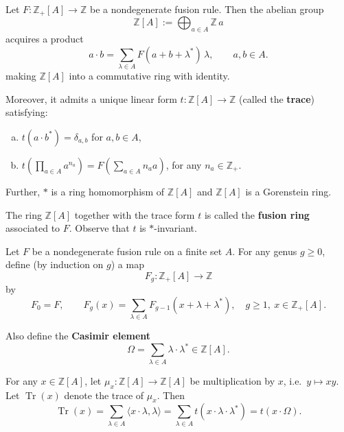 \documentclass[12pt]{article}
\begin{document}
\begin{proposition}
Let $F:\mathbb{Z}_+[A]\to \mathbb{Z}$ be a nondegenerate fusion rule. Then the abelian group
\[
\mathbb{Z}[A] := \bigoplus_{a\in A} \mathbb{Z}\, a
\]
acquires a product \begin{equation}\label{eq:fusion-product}
a\cdot b = \sum_{\lambda\in A} F(a+b+\lambda^*)\,\lambda,
\qquad a,b\in A.
\end{equation} making $\mathbb{Z}[A]$ into a commutative ring with identity.

Moreover, it admits a unique linear form $t:\mathbb{Z}[A]\to \mathbb{Z}$ (called the \textbf{trace}) satisfying:
\begin{enumerate}[(a)]
\item $t(a\cdot b^*)=\delta_{a,b}$ for $a,b\in A$,
\item $t\left(\prod_{a\in A} a^{n_a}\right)=F\left(\sum_{a\in A} n_a a\right)$, for any $n_a\in \mathbb{Z}_+$.
\end{enumerate}

Further, $*$ is a ring homomorphism of $\mathbb{Z}[A]$ and $\mathbb{Z}[A]$ is a Gorenstein ring.

The ring $\mathbb{Z}[A]$ together with the trace form $t$ is called the \textbf{fusion ring} associated to $F$. Observe that $t$ is $*$-invariant.
\end{proposition}


\begin{definition}
Let $F$ be a nondegenerate fusion rule on a finite set $A$. For any genus $g\ge 0$, define (by induction on $g$) a map
\[
F_g:\mathbb{Z}_+[A]\to \mathbb{Z}
\]
by
\[
F_0 = F, \qquad
F_g(x) = \sum_{\lambda\in A} F_{g-1}(x+\lambda+\lambda^*), \quad g\ge 1,\ x\in \mathbb{Z}_+[A].
\]

Also define the \textbf{Casimir element}
\begin{equation}\label{eq:casimir}
\Omega = \sum_{\lambda\in A} \lambda\cdot \lambda^* \in \mathbb{Z}[A].
\end{equation}

For any $x\in \mathbb{Z}[A]$, let $\mu_x:\mathbb{Z}[A]\to \mathbb{Z}[A]$ be multiplication by $x$, i.e.\ $y\mapsto xy$. Let $\operatorname{Tr}(x)$ denote the trace of $\mu_x$. Then
\begin{equation}\label{eq:trace}
\operatorname{Tr}(x)
= \sum_{\lambda\in A} \langle x\cdot \lambda,\lambda\rangle
= \sum_{\lambda\in A} t(x\cdot \lambda\cdot \lambda^*)
= t(x\cdot \Omega).
\end{equation}
\end{definition}
\end{document}
